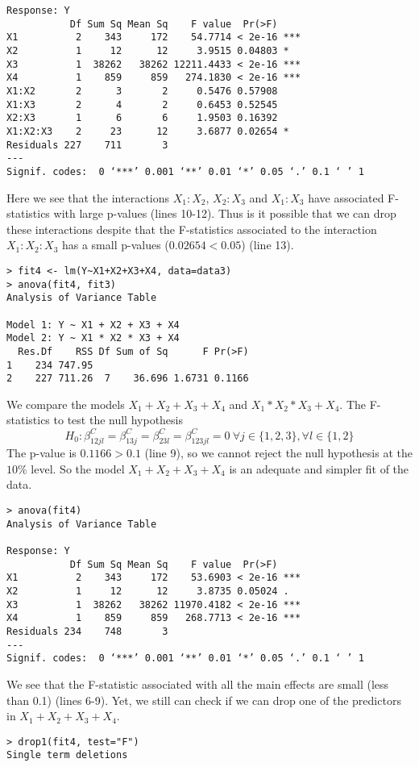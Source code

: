 \documentclass[10pt]{article}
\begin{document}
\begin{enumerate}
\begin{enumerate}[a)]
\begin{lstlisting}
Response: Y
           Df Sum Sq Mean Sq    F value  Pr(>F)    
X1          2    343     172    54.7714 < 2e-16 ***
X2          1     12      12     3.9515 0.04803 *  
X3          1  38262   38262 12211.4433 < 2e-16 ***
X4          1    859     859   274.1830 < 2e-16 ***
X1:X2       2      3       2     0.5476 0.57908    
X1:X3       2      4       2     0.6453 0.52545    
X2:X3       1      6       6     1.9503 0.16392    
X1:X2:X3    2     23      12     3.6877 0.02654 *  
Residuals 227    711       3                       
---
Signif. codes:  0 ‘***’ 0.001 ‘**’ 0.01 ‘*’ 0.05 ‘.’ 0.1 ‘ ’ 1
		\end{lstlisting}
		
		Here we see that the interactions $X_1:X_2$, $X_2:X_3$ and $X_1:X_3$ have associated F-statistics with large p-values (lines 10-12). Thus is it possible that we can drop these interactions despite that the F-statistics associated to the interaction $X_1:X_2:X_3$ has a small p-values ($0.02654 < 0.05$) (line 13).
		
		\begin{lstlisting}
> fit4 <- lm(Y~X1+X2+X3+X4, data=data3)
> anova(fit4, fit3)
Analysis of Variance Table

Model 1: Y ~ X1 + X2 + X3 + X4
Model 2: Y ~ X1 * X2 * X3 + X4
  Res.Df    RSS Df Sum of Sq      F Pr(>F)
1    234 747.95                           
2    227 711.26  7    36.696 1.6731 0.1166
		\end{lstlisting}
		We compare the models $X_1 + X_2 + X_3 + X_4$ and $X_1 * X_2 * X_3 + X_4$. The F-statistics to test the null hypothesis
		\begin{displaymath}
			H_0: \beta_{12jl}^C = \beta_{13j}^C = \beta_{23l}^C = \beta_{123jl}^C = 0 \  \forall j \in \{1,2,3\}, \forall l \in \{1,2\}
		\end{displaymath}
		The p-value is $0.1166 > 0.1$ (line 9), so we cannot reject the null hypothesis at the $10\%$ level. So the model $X_1 + X_2 + X_3 + X_4$ is an adequate and simpler fit of the data.
		\begin{lstlisting}
> anova(fit4)
Analysis of Variance Table

Response: Y
           Df Sum Sq Mean Sq    F value  Pr(>F)    
X1          2    343     172    53.6903 < 2e-16 ***
X2          1     12      12     3.8735 0.05024 .  
X3          1  38262   38262 11970.4182 < 2e-16 ***
X4          1    859     859   268.7713 < 2e-16 ***
Residuals 234    748       3                       
---
Signif. codes:  0 ‘***’ 0.001 ‘**’ 0.01 ‘*’ 0.05 ‘.’ 0.1 ‘ ’ 1
		\end{lstlisting}
		We see that the F-statistic associated with all the main effects are small (less than 0.1) (lines 6-9). Yet, we still can check if we can drop one of the predictors in $X_1 + X_2 + X_3 + X_4$. 
		\begin{lstlisting}
> drop1(fit4, test="F")
Single term deletions


\end{lstlisting}
\end{enumerate}
\end{enumerate}
\end{document}
